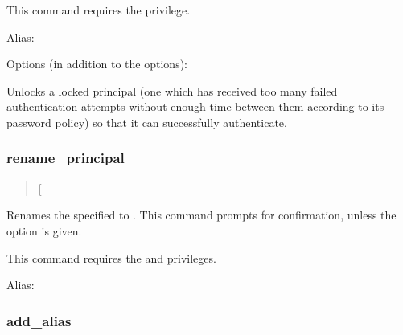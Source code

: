 \documentclass[letterpaper,10pt,english]{sphinxmanual}
\begin{document}
\sphinxAtStartPar
This command requires the  privilege.

\sphinxAtStartPar
Alias: 

\sphinxAtStartPar
Options (in addition to the  options):
\begin{description}
\sphinxAtStartPar
Unlocks a locked principal (one which has received too many failed
authentication attempts without enough time between them according
to its password policy) so that it can successfully authenticate.

\end{description}


\subsubsection{rename\_principal}
\label{\detokenize{admin/admin_commands/kadmin_local:rename-principal}}\label{\detokenize{admin/admin_commands/kadmin_local:id3}}\begin{quote}

\sphinxAtStartPar
{} {[}\sphinxstylestrong{\sphinxhyphen{}force}{]}  
\end{quote}

\sphinxAtStartPar
Renames the specified  to .  This
command prompts for confirmation, unless the  option is
given.

\sphinxAtStartPar
This command requires the  and  privileges.

\sphinxAtStartPar
Alias: 


\subsubsection{add\_alias}
\label{\detokenize{admin/admin_commands/kadmin_local:add-alias}}\label{\detokenize{admin/admin_commands/kadmin_local:id4}}\begin{quote}

\sphinxAtStartPar
{}  
\end{quote}
\end{document}
